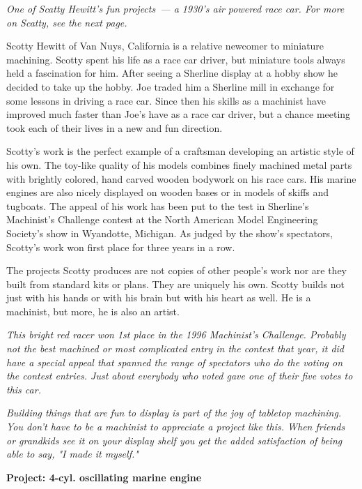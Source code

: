 

\textit{One of Scatty Hewitt's fun projects\ --- a 1930's air powered race car.
For more on Scatty, see the next page.}
\bigskip

Scotty Hewitt of Van Nuys, California is a relative newcomer to miniature
machining. Scotty spent his life as a race car driver, but miniature tools
always held a fascination for him. After seeing a Sherline display at a hobby
show he decided to take up the hobby. Joe traded him a Sherline mill in exchange
for some lessons in driving a race car. Since then his skills as a machinist
have improved much faster than Joe's have as a race car driver, but a chance
meeting took each of their lives in a new and fun direction.

Scotty's work is the perfect example of a craftsman developing an artistic style
of his own. The toy-like quality of his models combines finely machined metal
parts with brightly colored, hand carved wooden bodywork on his race cars. His
marine engines are also nicely displayed on wooden bases or in models of skiffs
and tugboats. The appeal of his work has been put to the test in Sherline's
Machinist's Challenge contest at the North American Model Engineering Society's
show in Wyandotte, Michigan. As judged by the show's spectators, Scotty's work
won first place for three years in a row.

The projects Scotty produces are not copies of other people's work nor are they
built from standard kits or plans. They are uniquely his own. Scotty builds not
just with his hands or with his brain but with his heart as well. He is a
machinist, but more, he is also an artist.

\bigskip
\textit{This bright red racer won 1st place in the 1996 Machinist's Challenge.
Probably not the best machined or most complicated entry in the contest that
year, it did have a special appeal that spanned the range of spectators who do
the voting on the contest entries. Just about everybody who voted gave one of
their five votes to this car.}

\textit{Building things that are fun to display is part of the joy of tabletop
machining. You don't have to be a machinist to appreciate a project like this.
When friends or grandkids see it on your display shelf you get the added
satisfaction of being able to say, "I made it myself."}
\bigskip

\bigskip
\textbf{Project: 4-cyl. oscillating marine engine}

